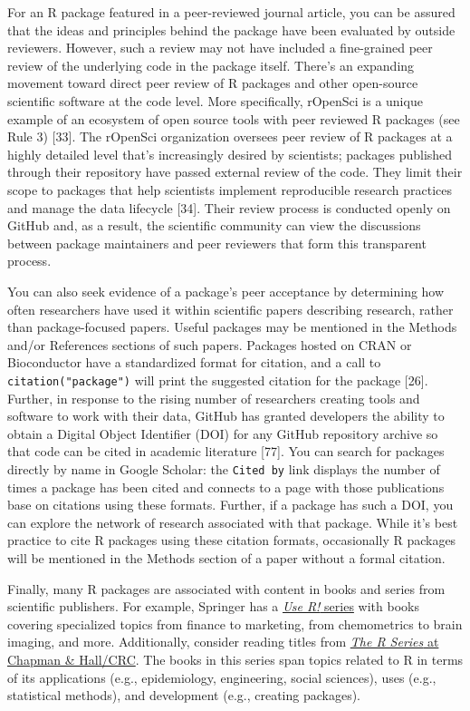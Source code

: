 \documentclass[10pt,letterpaper]{article}
\begin{document}
For an R package featured in a peer-reviewed journal article, you can be
assured that the ideas and principles behind the package have been
evaluated by outside reviewers. However, such a review may not have
included a fine-grained peer review of the underlying code in the
package itself. There's an expanding movement toward direct peer review
of R packages and other open-source scientific software at the code
level. More specifically, rOpenSci is a unique example of an ecosystem
of open source tools with peer reviewed R packages (see Rule 3)
{[}33{]}. The rOpenSci organization oversees peer review of R packages
at a highly detailed level that's increasingly desired by scientists;
packages published through their repository have passed external review
of the code. They limit their scope to packages that help scientists
implement reproducible research practices and manage the data lifecycle
{[}34{]}. Their review process is conducted openly on GitHub and, as a
result, the scientific community can view the discussions between
package maintainers and peer reviewers that form this transparent
process.

You can also seek evidence of a package's peer acceptance by determining
how often researchers have used it within scientific papers describing
research, rather than package-focused papers. Useful packages may be
mentioned in the Methods and/or References sections of such papers.
Packages hosted on CRAN or Bioconductor have a standardized format for
citation, and a call to \texttt{citation("package")} will print the
suggested citation for the package {[}26{]}. Further, in response to the
rising number of researchers creating tools and software to work with
their data, GitHub has granted developers the ability to obtain a
Digital Object Identifier (DOI) for any GitHub repository archive so
that code can be cited in academic literature {[}77{]}. You can search
for packages directly by name in Google Scholar: the \texttt{Cited\ by}
link displays the number of times a package has been cited and connects
to a page with those publications base on citations using these formats.
Further, if a package has such a DOI, you can explore the network of
research associated with that package. While it's best practice to cite
R packages using these citation formats, occasionally R packages will be
mentioned in the Methods section of a paper without a formal citation.

Finally, many R packages are associated with content in books and series
from scientific publishers. For example, Springer has a
\href{https://www.springer.com/series/6991}{\emph{Use R!} series} with
books covering specialized topics from finance to marketing, from
chemometrics to brain imaging, and more. Additionally, consider reading
titles from
\href{https://www.routledge.com/Chapman--HallCRC-The-R-Series/book-series/CRCTHERSER}{\emph{The
R Series} at Chapman \& Hall/CRC}. The books in this series span topics
related to R in terms of its applications (e.g., epidemiology,
engineering, social sciences), uses (e.g., statistical methods), and
development (e.g., creating packages).
\end{document}
